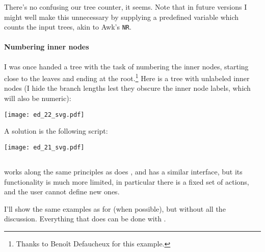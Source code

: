





There's no confusing our tree counter, it seems. Note that in future versions I
might well make this unnecessary by supplying a predefined variable which counts
the input trees, akin to Awk's \texttt{NR}.

\paragraph{Numbering inner nodes}

I was once handed a tree with the task of numbering the inner nodes, starting
close to the leaves and ending at the root.\footnote{Thanks to Beno\^{i}t
Defaucheux for this example.} Here is a tree with unlabeled inner nodes (I hide
the branch lengths lest they obscure the inner node labels, which will also be
numeric):


\begin{center}
\texttt{[image: ed\_22\_svg.pdf]}
\end{center}

A solution is the following \luaed{} script:





\begin{center}
\texttt{[image: ed\_21\_svg.pdf]}
\end{center} 


\subsection{\ed}

\ed{} works along the same principles as does \luaed, and has a similar
interface, but its functionality is much more limited, in particular there is a
fixed set of actions, and the user cannot define new ones.

\noindent{}I'll show the same examples as for \luaed{} (when possible), but
without all the discussion. Everything that \ed{} does can be done with \luaed.


\begin{samepage}

\end{samepage}

